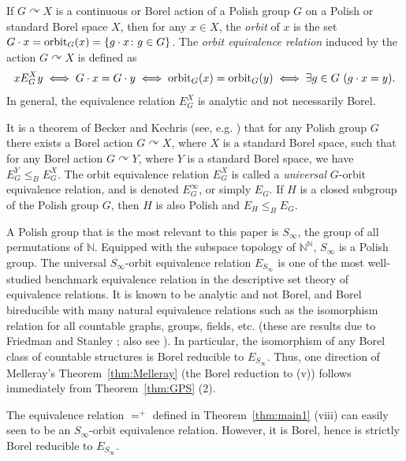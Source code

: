\documentclass{amsart}
\theoremstyle{definition}
\theoremstyle{problem}
\theoremstyle{remark}
\numberwithin{equation}{section}
\newcommand{\orb}{\mbox{\rm orbit}}
\begin{document}
If $G\curvearrowright X$ is a continuous or Borel action of a Polish group $G$ on a Polish or standard Borel space $X$, then for any $x\in X$, the {\em orbit} of $x$ is the set $G\cdot x=\orb_G(x)=\{g\cdot x\colon g\in G\}$. The {\em orbit equivalence relation} induced by the action $G\curvearrowright X$ is defined as
$$ xE^X_Gy\iff G\cdot x=G\cdot y\iff \orb_G(x)=\orb_G(y)\iff \exists g\in G\ (g\cdot x=y). $$
In general, the equivalence relation $E^X_G$ is analytic and not necessarily Borel. 


It is a theorem of Becker and Kechris (see, e.g. \cite[Theorem 3.3.4]{GaoBook}) that for any Polish group $G$ there exists a Borel action $G\curvearrowright X$, where $X$ is a standard Borel space, such that for any Borel action $G\curvearrowright Y$, where $Y$ is a standard Borel space, we have $E^Y_G\leq_B E^X_G$. The orbit equivalence relation $E^X_G$ is called a {\em universal} $G$-orbit equivalence relation, and is denoted $E^\infty_G$, or simply $E_G$. If $H$ is a closed subgroup of the Polish group $G$, then $H$ is also Polish and $E_H\leq_B E_G$. 

A Polish group that is the most relevant to this paper is $S_\infty$, the group of all permutations of $\mathbb{N}$. Equipped with the subspace topology of $\mathbb{N}^\mathbb{N}$, $S_\infty$ is a Polish group. The universal $S_\infty$-orbit equivalence relation $E_{S_\infty}$ is one of the most well-studied benchmark equivalence relation in the descriptive set theory of equivalence relations. It is known to be analytic and not Borel, and Borel bireducible with many natural equivalence relations such as the isomorphism relation for all countable graphs, groups, fields, etc. (these are results due to Friedman and Stanley \cite{FS}; also see \cite[Chapter 13]{GaoBook}). In particular, the isomorphism of any Borel class of countable structures is Borel reducible to $E_{S_\infty}$. Thus, one direction of Melleray's Theorem~\ref{thm:Melleray} (the Borel reduction to (v)) follows immediately from Theorem~\ref{thm:GPS} (2). 

The equivalence relation $=^+$ defined in Theorem~\ref{thm:main1} (viii) can easily seen to be an $S_\infty$-orbit equivalence relation. However, it is Borel, hence is strictly Borel reducible to $E_{S_\infty}$. 
\end{document}
